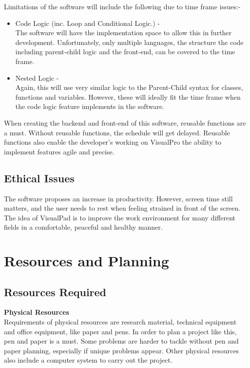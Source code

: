 \documentclass[conference]{IEEEtran}
\begin{document}
        Limitations of the software will include the following due to time frame issues:-
        \begin{itemize}
          \item Code Logic (inc. Loop and Conditional Logic.) -\\
            The software will have the implementation space to allow this in further development. Unfortunately, only multiple languages, the structure the code including parent-child logic and the front-end, can be covered to the time frame.
          \item Nested Logic -\\
            Again, this will use very similar logic to the Parent-Child syntax for classes, functions and variables. However, these will ideally fit the time frame when the code logic feature implements in the   software.
        \end{itemize}
        When creating the backend and front-end of this software, reusable functions are a must. Without reusable functions, the schedule will get delayed. Reusable functions also enable the developer's working on VisualPro the ability to implement features agile and precise. 
        
      \subsection{Ethical Issues}
        The software proposes an increase in productivity. However, screen time still matters, and the user needs to rest when feeling strained in front of the screen. The idea of VisualPad is to improve the work environment for many different fields in a comfortable, peaceful and healthy manner. 

    \section{Resources and Planning}
    \label{sec: resourcesPlanning}
      \subsection{Resources Required}
        \textbf{Physical Resources}\\
          Requirements of physical resources are research material, technical equipment and office equipment, like paper and pens. In order to plan a project like this, pen and paper is a must. Some problems are harder to tackle without pen and paper planning, especially if unique problems appear. Other physical resources also include a computer system to carry out the project.
\end{document}
